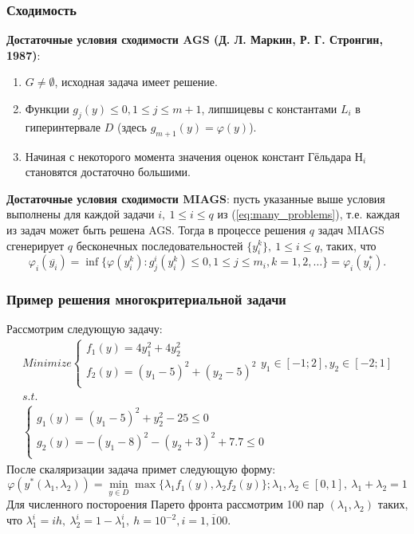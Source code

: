 \documentclass[aspectratio=1610]{beamer}
\begin{document}
\begin{frame}
  \frametitle{Сходимость}
  \textbf{Достаточные условия сходимости AGS (Д. Л. Маркин, Р. Г. Стронгин, 1987)}:
  \begin{enumerate}
    \item \(G\ne\emptyset\), исходная задача имеет решение.
    \item Функции \(g_j(y)\leqslant 0, 1\leqslant j\leqslant m + 1\), липшицевы с
      константами \(L_i\) в гиперинтервале \(D\) (здесь \(g_{m+1}(y)=\varphi(y)\)).
    \item Начиная с некоторого момента значения оценок констант Гёльдара \(Н_i\) становятся достаточно большими.
  \end{enumerate}

  \textbf{Достаточные условия сходимости MIAGS}: пусть указанные выше условия выполнены для
  каждой задачи \(i,\:1\leqslant i\leqslant q\) из (\ref{eq:many_problems}),
  т.е. каждая из задач может быть решена AGS.
    Тогда в процессе решения \(q\) задач MIAGS сгенерирует
    \(q\) бесконечных последовательностей \(\{y^k_i\},\:1\leqslant i\leqslant q\), таких, что
    \begin{displaymath}
      \varphi_i(\overline{y_i})=\inf\{ \varphi(y^k_i): g^i_j(y^k_i)\leqslant 0,1\leqslant j\leqslant m_i, k=1,2,\dots\}=\varphi_i(y^*_i).
    \end{displaymath}
\end{frame}

\begin{frame}
  \frametitle{Пример решения многокритериальной задачи}
  Рассмотрим следующую задачу:
  \begin{displaymath}
    \begin{array}{l}
        Minimize \left \{
        \begin{array}{l}
          f_1(y) = 4 y_1^2 + 4 y_2^2 \\
          f_2(y) = (y_1-5)^2 + (y_2-5)^2 \\
        \end{array}
        \right .
        y_1\in [-1;2],y_2\in [-2;1]
        \\s.t.
        \\
        \left \{
        \begin{array}{l}
          g_1(y) = (y_1 - 5)^2 + y_2^2 - 25 \leqslant 0 \\
          g_2(y) = -(y_1 - 8)^2 - (y_2 + 3)^2 + 7.7 \leqslant 0\\
        \end{array}
        \right .
    \end{array}
  \end{displaymath}
  После скаляризации задача примет следующую форму:
  \begin{displaymath}
    \varphi(y^*(\lambda_1,\lambda_2))=\min_{y\in D}\max\{\lambda_1 f_1(y), \lambda_2 f_2(y)\};\lambda_1,\lambda_2\in[0,1],\: \lambda_1+\lambda_2=1
\end{displaymath}
Для численного постороения Парето фронта рассмотрим
100 пар \((\lambda_1,\lambda_2)\) таких, что
\(\lambda_1^i=i h,\: \lambda_2^i=1-\lambda_1^i,\: h=10^{-2},i=\overline{1, 100}\).
\end{frame}
\end{document}
